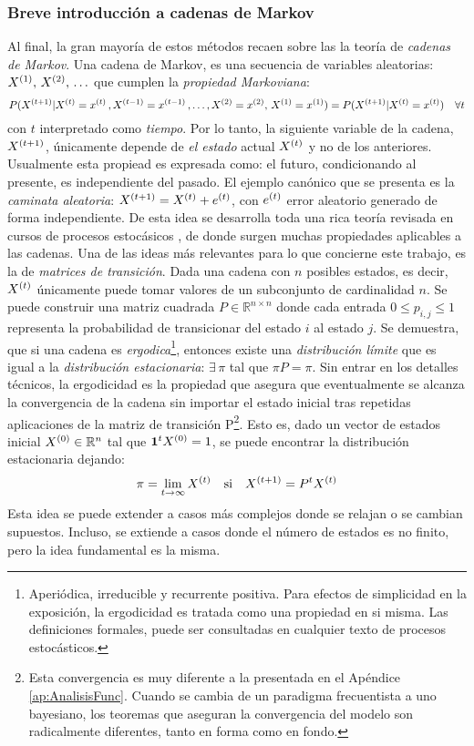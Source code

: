 \documentclass[../Main/Main.tex]{subfiles}
\begin{document}
\subsubsection{Breve introducción a cadenas de Markov}
Al final, la gran mayoría de estos métodos recaen sobre las la teoría de \textit{cadenas de Markov}. Una cadena de Markov, es una secuencia de variables aleatorias: $X^{(1)},\,X^{(2)},\,\ldots$ que cumplen la \textit{propiedad Markoviana}:
$$P(X^{(t+1)}|X^{(t)} = x^{(t)}\, ,X^{(t-1)} = x^{(t-1)}\,,\ldots,X^{(2)} = x^{(2)},\,X^{(1)} = x^{(1)}) = P(X^{(t+1)}|X^{(t)} = x^{(t)}) \quad\forall t$$
con $t$ interpretado como \textit{tiempo}. Por lo tanto, la siguiente variable de la cadena, $X^{(t+1)}$, únicamente depende de \textit{el estado} actual $X^{(t)}$ y no de los anteriores. Usualmente esta propiead es expresada como: el futuro, condicionando al presente, es independiente del pasado. El ejemplo canónico que se presenta es la \textit{caminata aleatoria}: $X^{(t+1)} = X^{(t)} + e^{(t)}$, con $e^{(t)}$ error aleatorio generado de forma independiente. De esta idea se desarrolla toda una rica teoría revisada en cursos de procesos estocásicos  \autocite{ross2009introduction}, de donde surgen muchas propiedades aplicables a las cadenas. Una de las ideas más relevantes para lo que concierne este trabajo, es la de \textit{matrices de transición}. Dada una cadena con $n$ posibles estados, es decir, $X^{(t)}$ únicamente puede tomar valores de un subconjunto de cardinalidad $n$. Se puede construir una matriz cuadrada $P\in\mathbb{R}^{n\times n}$ donde cada entrada $0\leq p_{i,j}\leq1$ representa la probabilidad de transicionar del estado $i$ al estado $j$. Se demuestra, que si una cadena es \textit{ergodica}\footnote{Aperiódica, irreducible y  recurrente positiva. Para efectos de simplicidad en la exposición, la ergodicidad es tratada como una propiedad en si misma. Las definiciones formales, puede ser consultadas en cualquier texto de procesos estocásticos.}, entonces existe una \textit{distribución límite} que es igual a la \textit{distribución estacionaria}: $\exists \,\pi$ tal que $\pi P = \pi$. Sin entrar en los detalles técnicos, la ergodicidad es la propiedad que asegura que eventualmente se alcanza la convergencia de la cadena sin importar el estado inicial tras repetidas aplicaciones de la matriz de transición P\footnote{Esta convergencia es muy diferente a la presentada en el Apéndice \ref{ap:AnalisisFunc}. Cuando se cambia de un paradigma frecuentista a uno bayesiano, los teoremas que aseguran la convergencia del modelo son radicalmente diferentes, tanto en forma como en fondo.}. Esto es, dado un vector de estados inicial $X^{(0)}\in\mathbb{R}^n$ tal que $\mathbf{1}^tX^{(0)} = 1$, se puede encontrar la distribución estacionaria dejando: 
\begin{align}
\pi = \lim_{t\rightarrow\infty} X^{(t)} \quad \text{si} \quad X^{(t+1)} = P^tX^{(t)} \label{ec:DistLimite}
\end{align}
Esta idea se puede extender a casos más complejos donde se relajan o se cambian supuestos. Incluso, se extiende a casos donde el número de estados es no finito, pero la idea fundamental es la misma. 
\end{document}
